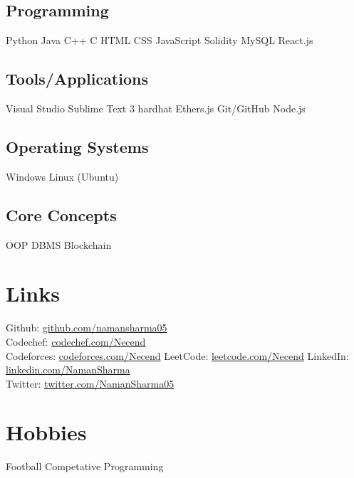 \documentclass[letterpaper]{deedy-resume} %
\begin{document}
\begin{minipage}[t]{0.33\textwidth}
\subsection{Programming}
\textbullet{}Python \textbullet{} Java \textbullet{} C++ \textbullet{} C \textbullet{} HTML \textbullet{}CSS \textbullet{}JavaScript \textbullet{} Solidity \textbullet{} MySQL
\textbullet{}React.js
\sectionspace

\subsection{Tools/Applications}
\textbullet{}Visual Studio \textbullet{} Sublime Text 3
\textbullet{} hardhat \textbullet{} Ethers.js \textbullet{} Git/GitHub \textbullet{} Node.js

\sectionspace
\subsection{Operating Systems}
\textbullet{}Windows \textbullet{} Linux (Ubuntu)

\sectionspace %
\subsection{Core Concepts}
\textbullet{} OOP
\textbullet{} DBMS
\textbullet{} Blockchain

\section{Links} 

Github: \href{https://github.com/namansharma05}{github.com/namansharma05} \\
Codechef: \href{https://www.codechef.com/users/necend}{codechef.com/Necend} \\
Codeforces: \href{https://codeforces.com/profile/Necend}{codeforces.com/Necend}
LeetCode: \href{https://leetcode.com/Necend/}{leetcode.com/Necend}
LinkedIn: \href{https://linkedin.com/in/naman-kumar-sharma-5575a4184/}{linkedin.com/NamanSharma} \\
Twitter: \href{https://twitter.com/NamanSharma05}{twitter.com/NamanSharma05}


\sectionspace %

\section{Hobbies}
\textbullet{}Football \textbullet{} Competative Programming

\end{minipage} %
\end{document}
